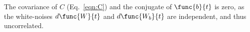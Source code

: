The covariance of $C$ (Eq.~\ref{eqn:C}) and the conjugate of $\func{b}{t}$ is zero, as the white-noises $d\func{W}{t}$ and $d\func{W_b}{t}$ are independent, and thus uncorrelated.